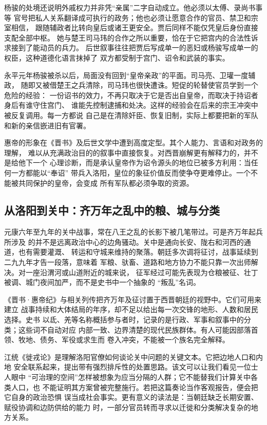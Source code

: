 杨骏的处境还说明外戚权力并非凭“亲属”二字自动成立。他必须以太傅、录尚书事等
官号把私人关系翻译成可执行的政务；他也必须让愿意合作的官员、禁卫和宗室相信，
跟随辅政者比转向皇后或诸王更安全。贾后同样不能仅凭皇后身份直接支配全部中枢。
她与楚王司马玮的合作之所以重要，恰在于它把宫内的合法性诉求接到了能动员的兵力。
后世叙事往往把贾后写成单一的恶妇或杨骏写成单一的权臣，这种道德化语言抹掉了
双方都受制于宫门、诏令和武装的事实。

永平元年杨骏被杀以后，局面没有回到“皇帝亲政”的平面。司马亮、卫瓘一度辅政，
随即又被借楚王之兵清除，司马玮也很快遭诛。短促的轮替使官员学到一个危险的经验：
一份诏书的效力，不再只取决于它是否出自皇帝，而取决于持诏者身后有谁守住宫门、
谁能先控制逮捕和处决。这样的经验会在后来的宗王冲突中被反复调用。每一方都说
自己是在清除奸臣、恢复旧制，实际上都要把新的军队和新的亲信嵌进旧有官署。

惠帝的形象在《晋书》及后世文学中遭到高度定型。其个人能力、言语和对政务的理解，
难以从充满政治目的的叙事中直接恢复。对西晋崩解更有解释力的，并不是给他下一个
心理诊断，而是承认皇帝作为诏令源头的地位已被多方利用：当任何一方都能以“奉诏”
带兵入洛阳，皇位的象征价值反而使争夺更难停止。一个不能被共同保护的皇帝，会变成
所有军队都必须争取的资源。

\subsection{从洛阳到关中：齐万年之乱中的粮、城与分类}

元康六年至九年的关中战事，常在八王之乱的长影下被几笔带过。可是齐万年起兵所涉及
的并不是远离政治中心的边角骚动。关中是通向长安、陇右和河西的通道，也有需要灌溉、
转运和守城来维持的聚落。朝廷多次调将征讨，战事延续到二九九年才告一段落，意味着
军粮、驮畜、道路和地方协力不能只靠一次出师解决。对一座沿渭河或山道附近的城来说，
征军经过可能先表现为仓粮被征、壮丁被调、城门夜间加严，而不是史书中一个抽象的
“叛乱”名词。

《晋书·惠帝纪》与相关列传把齐万年及征讨置于西晋朝廷的视野中。它们可用来建立
战事持续和大体结局的年序，却不足以给出每一次交锋的地形、人数和居民选择。史书
以氐、羌等名称概括参与者时，记录的是行政、军事和叙事中的分类；这些词不自动对应
内部一致、边界清楚的现代民族群体。有人可能因部落首领、牧地、债务、军役或求生而
卷入冲突，不能被一个族名完全解释。

江统《徙戎论》是理解洛阳官僚如何谈论关中问题的关键文本。它把边地人口和内地
安全联系起来，提出带有强烈排斥性的处置思路。该文可以让我们看见一位士人眼中
“可治理的空间”怎样被想象为应当分隔的人群；它不能替我们计算关中各类人口，也
不能证明其方案曾被完整施行。若把这篇奏论当作客观报告，便会把它自身的政治恐惧
误当成社会事实。更有意义的读法是：当朝廷缺乏长期安置、赋役协调和边防供给的能力
时，一部分官员转而寻求以迁徙和分类解决复杂的地方关系。

